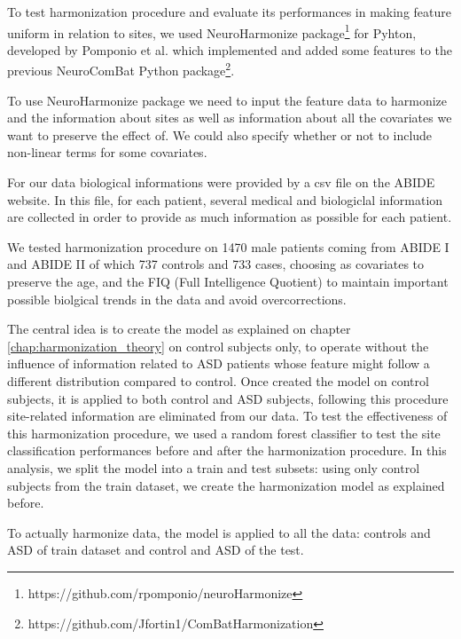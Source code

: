 \documentclass[11pt]{report}
\begin{document}
To test harmonization procedure and evaluate its performances in making feature uniform in relation to sites, we used NeuroHarmonize package\footnote{https://github.com/rpomponio/neuroHarmonize} for Pyhton, developed by Pomponio et al. \cite{pomponio-2019} which implemented and added some features to the previous NeuroComBat Python package\footnote{https://github.com/Jfortin1/ComBatHarmonization}.

To use NeuroHarmonize package we need to input the feature data to harmonize and the information about sites as well as information about all the covariates we want to preserve the effect of.
We could also specify whether or not to include non-linear terms for some covariates.

For our data biological informations were provided by a csv file on the ABIDE website. In this file, for each patient, several medical and biologiclal information are collected in order to provide as much information as possible for each patient.

We tested harmonization procedure on 1470 male patients coming from ABIDE I and ABIDE II of which 737 controls and 733 cases, choosing as covariates to preserve the age, and the FIQ (Full Intelligence Quotient) to maintain important possible biolgical trends in the data and avoid overcorrections.

The central idea is to create the model as explained on chapter \ref{chap:harmonization_theory} on control subjects only, to operate without the influence of information related to ASD patients whose feature might follow a different distribution compared to control.
Once created the model on control subjects, it is applied to both control and ASD subjects, following this procedure site-related information are eliminated from our data.
To test the effectiveness of this harmonization procedure, we used a random forest classifier to test the site classification performances before and after the harmonization procedure.
In this analysis, we split the model into a train and test subsets: using only control subjects from the train dataset, we create the harmonization model as explained before.

To actually harmonize data, the model is applied to all the data: controls and ASD of train dataset and control and ASD of the test.
\end{document}
